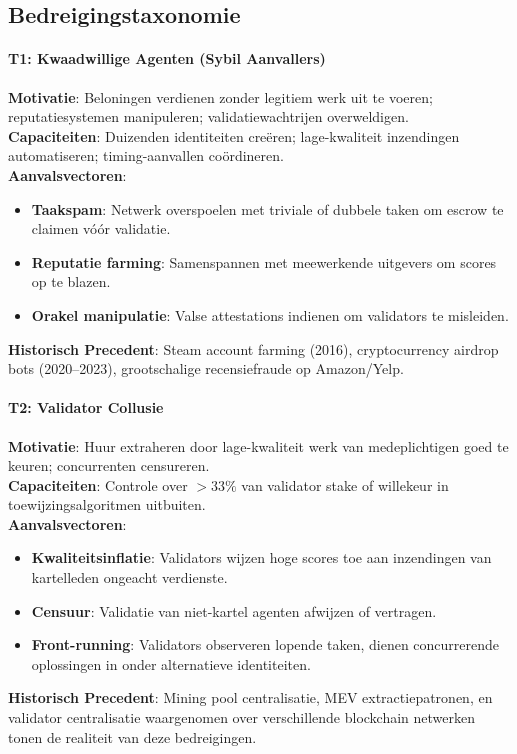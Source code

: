 \documentclass[11pt]{article}
\begin{document}
\subsection{Bedreigingstaxonomie}

\paragraph{T1: Kwaadwillige Agenten (Sybil Aanvallers)}
\textbf{Motivatie}: Beloningen verdienen zonder legitiem werk uit te voeren; reputatiesystemen manipuleren; validatiewachtrijen overweldigen.\\
\textbf{Capaciteiten}: Duizenden identiteiten creëren; lage-kwaliteit inzendingen automatiseren; timing-aanvallen coördineren.\\
\textbf{Aanvalsvectoren}:
\begin{itemize}[noitemsep]
  \item \textbf{Taakspam}: Netwerk overspoelen met triviale of dubbele taken om escrow te claimen vóór validatie.
  \item \textbf{Reputatie farming}: Samenspannen met meewerkende uitgevers om scores op te blazen.
  \item \textbf{Orakel manipulatie}: Valse attestations indienen om validators te misleiden.
\end{itemize}
\textbf{Historisch Precedent}: Steam account farming (2016), cryptocurrency airdrop bots (2020--2023), grootschalige recensiefraude op Amazon/Yelp.

\paragraph{T2: Validator Collusie}
\textbf{Motivatie}: Huur extraheren door lage-kwaliteit werk van medeplichtigen goed te keuren; concurrenten censureren.\\
\textbf{Capaciteiten}: Controle over $>33\%$ van validator stake of willekeur in toewijzingsalgoritmen uitbuiten.\\
\textbf{Aanvalsvectoren}:
\begin{itemize}[noitemsep]
  \item \textbf{Kwaliteitsinflatie}: Validators wijzen hoge scores toe aan inzendingen van kartelleden ongeacht verdienste.
  \item \textbf{Censuur}: Validatie van niet-kartel agenten afwijzen of vertragen.
  \item \textbf{Front-running}: Validators observeren lopende taken, dienen concurrerende oplossingen in onder alternatieve identiteiten.
\end{itemize}
\textbf{Historisch Precedent}: Mining pool centralisatie, MEV extractiepatronen, en validator centralisatie waargenomen over verschillende blockchain netwerken tonen de realiteit van deze bedreigingen.
\end{document}
